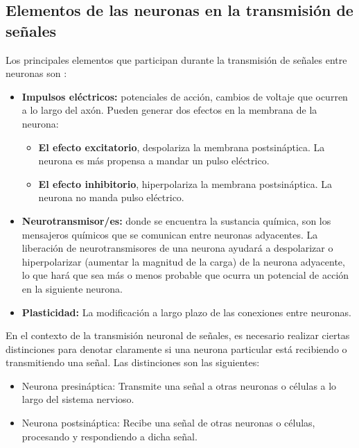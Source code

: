 \subsection{Elementos de las neuronas en la transmisión de señales}

Los principales elementos que participan durante la transmisión de señales entre neuronas son \parencite{sistemaNervioso}:


\begin{itemize}
\item \textbf{Impulsos eléctricos:} potenciales de acción, cambios de voltaje que ocurren a lo largo del axón. %
Pueden generar dos efectos en la membrana de la neurona: 
	\begin{itemize}
	\item \textbf{El efecto excitatorio}, despolariza la membrana postsináptica. La neurona es más propensa a mandar un pulso eléctrico.  
	\item \textbf{El efecto inhibitorio}, hiperpolariza la membrana postsináptica. La neurona no manda pulso eléctrico.

	\end{itemize}

\item \textbf{Neurotransmisor/es:} donde se encuentra la sustancia química, %
son los mensajeros químicos que se comunican entre neuronas adyacentes. La liberación de neurotransmisores de una neurona ayudará a despolarizar o hiperpolarizar (aumentar la magnitud de la carga) de la neurona adyacente, lo que hará que sea más o menos probable que ocurra un potencial de acción en la siguiente neurona.
 
\item \textbf{Plasticidad:} La modificación a largo plazo de las conexiones entre neuronas. %
\end{itemize}



En el contexto de la transmisión neuronal de señales, es necesario realizar ciertas distinciones para denotar claramente si una neurona particular está recibiendo o transmitiendo una señal. Las distinciones son las siguientes:
 \begin{itemize}
  \item Neurona presináptica: Transmite una señal a otras neuronas o células a lo largo del sistema nervioso.
  \item Neurona postsináptica: Recibe una señal de otras neuronas o células, procesando y respondiendo a dicha señal.
 \end{itemize}  

